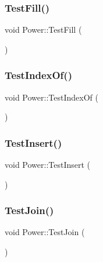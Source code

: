 \mbox{\label{namespace_power_ac75f67a1bb1ba76b63fb032055217d0a}} 
\subsubsection{\texorpdfstring{Test\+Fill()}{TestFill()}}
{\footnotesize\ttfamily void Power\+::\+Test\+Fill (\begin{DoxyParamCaption}{ }\end{DoxyParamCaption})}

\mbox{\label{namespace_power_a6dc388a4544e6d59e43eab4625af166f}} 
\subsubsection{\texorpdfstring{Test\+Index\+Of()}{TestIndexOf()}}
{\footnotesize\ttfamily void Power\+::\+Test\+Index\+Of (\begin{DoxyParamCaption}{ }\end{DoxyParamCaption})}

\mbox{\label{namespace_power_a14fd95cb9dec263deb7131de8337a930}} 
\subsubsection{\texorpdfstring{Test\+Insert()}{TestInsert()}}
{\footnotesize\ttfamily void Power\+::\+Test\+Insert (\begin{DoxyParamCaption}{ }\end{DoxyParamCaption})}

\mbox{\label{namespace_power_a5cc8bd07de43764591174f75a8da14fe}} 
\subsubsection{\texorpdfstring{Test\+Join()}{TestJoin()}}
{\footnotesize\ttfamily void Power\+::\+Test\+Join (\begin{DoxyParamCaption}{ }\end{DoxyParamCaption})}


